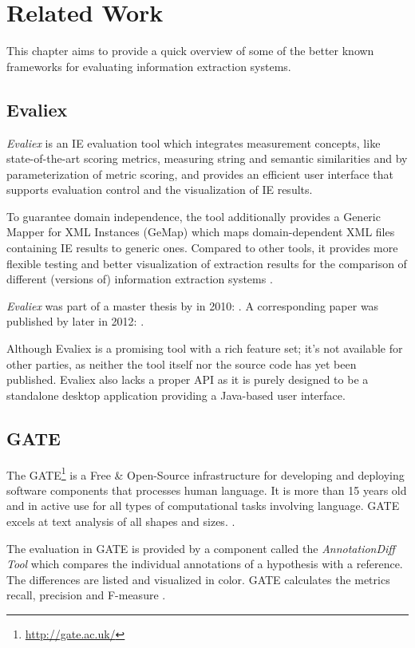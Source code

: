 \section{Related Work}
\label{sec:related-work}
This chapter aims to provide a quick overview of some of the better known frameworks for evaluating information extraction systems.

\subsection{Evaliex}
\textit{Evaliex} is an \gls{IE} evaluation tool which integrates measurement concepts, like state-of-the-art scoring metrics, measuring string and semantic similarities and by parameterization of metric scoring, and provides an efficient user interface that supports evaluation control and the visualization of \gls{IE} results.

To guarantee domain independence, the tool additionally provides a Generic Mapper for XML Instances (GeMap) which maps domain-dependent XML files containing \gls{IE} results to generic ones. Compared to other tools, it provides more flexible testing and better visualization of extraction results for the comparison of different (versions of) information extraction systems \cite{Feilmayr:2012}.

\textit{Evaliex}  was part of a master thesis by \citeauthor{Linsmayr:2010} in 2010:  \cite{Linsmayr:2010}. A corresponding paper was published by \citeauthor{Feilmayr:2012} later in 2012:  \cite{Feilmayr:2012}.

Although Evaliex is a promising tool with a rich feature set; it's not available for other parties, as neither the tool itself nor the source code has yet been published. Evaliex also lacks a proper \gls{API} as it is purely designed to be a standalone desktop application providing a Java-based user interface.

\subsection{GATE}
The \gls{GATE}\footnote{\url{http://gate.ac.uk/}} is a Free \& Open-Source infrastructure for developing and deploying software components that processes human language. It is more than 15 years old and in active use for all types of computational tasks involving language. GATE excels at text analysis of all shapes and sizes. \cite{Cunningham:2011}.

The evaluation in GATE is provided by a component called the \textit{AnnotationDiff Tool} which compares the individual annotations of a hypothesis with a reference. The differences are listed and visualized in color. GATE calculates the metrics recall, precision and F-measure \cite{Linsmayr:2010}.

